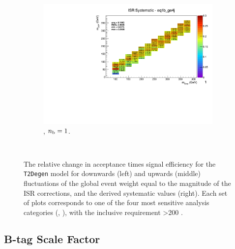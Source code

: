 \begin{figure}[ht!]
\begin{subfigure}[b]{0.32\textwidth}
    \includegraphics[width=\textwidth, page=1]{Figs/sms/t2degen/v19/systs_v2/T2_4body_ISR_eq1b_ge4j.pdf}
    \caption{\njhigh, $n_{\text{b}} = 1$.}
  \end{subfigure}\\
  \caption{The relative change in acceptance times signal efficiency for the
  \texttt{T2Degen} model for downwards (left) and upwards (middle) fluctuations
  of the global event weight equal to the magnitude of the ISR corrections,
  and the derived systematic values (right). Each set of plots corresponds
  to one of the four most sensitive analysis categories (\nb, \nj), with the
  inclusive requirement \HT>200 \gev.}
  \label{fig:sms-isr-t2degen}
\end{figure}


\newpage
\subsection*{B-tag Scale Factor}
\label{sec:t2degen_btag_plots}

